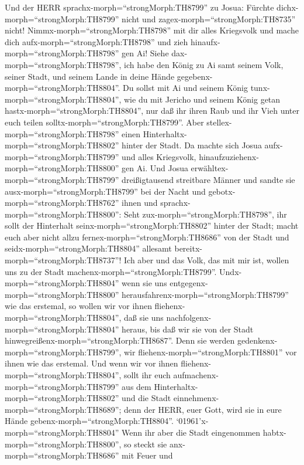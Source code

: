  Und der HERR sprachx-morph=``strongMorph:TH8799'' zu Josua:
Fürchte dichx-morph=``strongMorph:TH8799'' nicht und
zagex-morph=``strongMorph:TH8735'' nicht!
Nimmx-morph=``strongMorph:TH8798'' mit dir alles Kriegsvolk und mache
dich aufx-morph=``strongMorph:TH8798'' und zieh
hinaufx-morph=``strongMorph:TH8798'' gen Ai! Siehe
dax-morph=``strongMorph:TH8798'', ich habe den König zu Ai samt seinem
Volk, seiner Stadt, und seinem Lande in deine Hände
gegebenx-morph=``strongMorph:TH8804''.  Du sollst mit Ai und
seinem König tunx-morph=``strongMorph:TH8804'', wie du mit Jericho und
seinem König getan hastx-morph=``strongMorph:TH8804'', nur daß ihr ihren
Raub und ihr Vieh unter euch teilen solltx-morph=``strongMorph:TH8799''.
Aber stellex-morph=``strongMorph:TH8798'' einen
Hinterhaltx-morph=``strongMorph:TH8802'' hinter der Stadt. 
Da machte sich Josua aufx-morph=``strongMorph:TH8799'' und alles
Kriegsvolk, hinaufzuziehenx-morph=``strongMorph:TH8800'' gen Ai. Und
Josua erwähltex-morph=``strongMorph:TH8799'' dreißigtausend streitbare
Männer und sandte sie ausx-morph=``strongMorph:TH8799'' bei der Nacht
 und gebotx-morph=``strongMorph:TH8762'' ihnen und
sprachx-morph=``strongMorph:TH8800'': Seht
zux-morph=``strongMorph:TH8798'', ihr sollt der Hinterhalt
seinx-morph=``strongMorph:TH8802'' hinter der Stadt; macht euch aber
nicht allzu fernex-morph=``strongMorph:TH8686'' von der Stadt und
seidx-morph=``strongMorph:TH8804'' allesamt
bereitx-morph=``strongMorph:TH8737''!  Ich aber und das
Volk, das mit mir ist, wollen uns zu der Stadt
machenx-morph=``strongMorph:TH8799''. Undx-morph=``strongMorph:TH8804''
wenn sie uns entgegenx-morph=``strongMorph:TH8800''
herausfahrenx-morph=``strongMorph:TH8799'' wie das erstemal, so wollen
wir vor ihnen fliehenx-morph=``strongMorph:TH8804'',  daß
sie uns nachfolgenx-morph=``strongMorph:TH8804'' heraus, bis daß wir sie
von der Stadt hinwegreißenx-morph=``strongMorph:TH8687''. Denn sie
werden gedenkenx-morph=``strongMorph:TH8799'', wir
fliehenx-morph=``strongMorph:TH8801'' vor ihnen wie das erstemal. Und
wenn wir vor ihnen fliehenx-morph=``strongMorph:TH8804'', 
sollt ihr euch aufmachenx-morph=``strongMorph:TH8799'' aus dem
Hinterhaltx-morph=``strongMorph:TH8802'' und die Stadt
einnehmenx-morph=``strongMorph:TH8689''; denn der HERR, euer Gott, wird
sie in eure Hände gebenx-morph=``strongMorph:TH8804''. 
`01961'\textbar x-morph=``strongMorph:TH8804'' Wenn ihr aber die Stadt
eingenommen habtx-morph=``strongMorph:TH8800'', so steckt sie
anx-morph=``strongMorph:TH8686'' mit Feuer und
